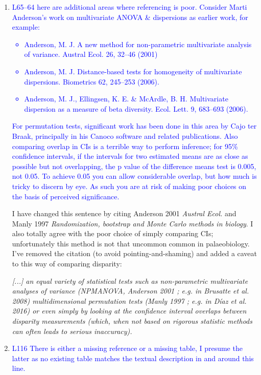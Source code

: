 \documentclass[12pt,letterpaper]{article}
\begin{document}
\begin{enumerate}
\item{\textcolor{blue}{L65--64 here are additional areas where referencing is poor. Consider Marti Anderson's work on multivariate ANOVA \& dispersions as earlier work, for example:
\begin{itemize}
\item Anderson, M. J. A new method for non-parametric multivariate analysis of variance. Austral Ecol. 26, 32–46 (2001)
\item Anderson, M. J. Distance-based tests for homogeneity of multivariate dispersions. Biometrics 62, 245–253 (2006).
\item Anderson, M. J., Ellingsen, K. E. \& McArdle, B. H. Multivariate dispersion as a measure of beta diversity. Ecol. Lett. 9, 683–693 (2006).
\end{itemize}
}}
\textcolor{blue}{For permutation tests, significant work has been done in this area by Cajo ter Braak, principally in his Canoco software and related publications.
Also comparing overlap in CIs is a terrible way to perform inference; for 95\% confidence intervals, if the intervals for two estimated means are as close as possible but not overlapping, the p value of the difference means test is 0.005, not 0.05. To achieve 0.05 you can allow considerable overlap, but how much is tricky to discern by eye.
As such you are at risk of making poor choices on the basis of perceived significance.}

I have changed this sentence by citing Anderson 2001 \textit{Austral Ecol.} and Manly 1997 \textit{Randomization, bootstrap and Monte Carlo methods in biology}.
I also totally agree with the poor choice of simply comparing CIs; unfortunately this method is not that uncommon common in palaeobiology.
I've removed the citation (to avoid pointing-and-shaming) and added a caveat to this way of comparing disparity:

\textit{[...] an equal variety of statistical tests such as non-parametric multivariate analyses of variance (NPMANOVA, Anderson 2001 ; e.g. in Brusatte et al. 2008) multidimensional permutation tests (Manly 1997 ; e.g. in Díaz et al. 2016) or even simply by looking at the confidence interval overlaps between disparity measurements (which, when not based on rigorous statistic methods can often leads to serious inaccuracy).}

\item{\textcolor{blue}{L116 There is either a missing reference or a missing table, I presume the latter as no existing table matches the textual description in and around this line.}}


\end{enumerate}
\end{document}
